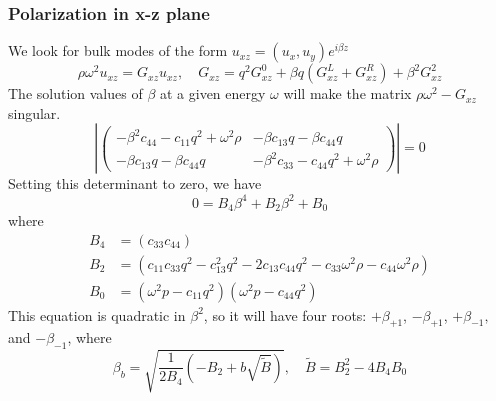 \documentclass{article}
\begin{document}
\subsubsection{Polarization in x-z plane}
We look for bulk modes of the form $u_{xz}=(u_x,u_y)e^{i\beta z}$
\begin{equation}
  \rho\omega^2u_{xz}=
  G_{xz}u_{xz}, \quad G_{xz}= q^2G_{xz}^0 +\beta q (G_{xz}^L+G_{xz}^R)  + \beta^2 G_{xz}^2
\end{equation}
The solution values of $\beta$ at a given energy $\omega$ will make the matrix $\rho \omega^2-G_{xz}$ singular.
\begin{equation}
\left|\begin{pmatrix}- \beta^{2} c_{44} - c_{11} q^{2} + \omega^{2} \rho & - \beta c_{13} q - \beta c_{44} q\\- \beta c_{13} q - \beta c_{44} q & - \beta^{2} c_{33} - c_{44} q^{2} + \omega^{2} \rho\end{pmatrix}\right|=0
\end{equation}
Setting this determinant to zero, we have
\begin{equation}
  0=B_4\beta^4+B_2\beta^2+B_0
\end{equation}
where
\begin{align}
  B_4&=\left( c_{33} c_{44} \right)\\
  B_2&=\left( c_{11} c_{33} q^{2} - c_{13}^{2} q^{2} - 2 c_{13} c_{44} q^{2} - c_{33} \omega^{2} \rho - c_{44} \omega^{2} \rho \right)\\
  B_0&=\left(\omega^{2} p- c_{11} q^{2} \right) \left(\omega^{2} p- c_{44} q^{2}\right)
\end{align}
This equation is quadratic in $\beta^2$, so it will have four roots: $+\beta_{+1}$, $-\beta_{+1}$, $+\beta_{-1},$ and $-\beta_{-1}$, where
\begin{equation}
  \beta_b=\sqrt{\frac{1}{2 B_4}\left( -B_2 +b \sqrt{\tilde B} \right)}, \quad \tilde B =B_2^2-4B_4B_0
  \label{eq:betab}
\end{equation}
\end{document}
